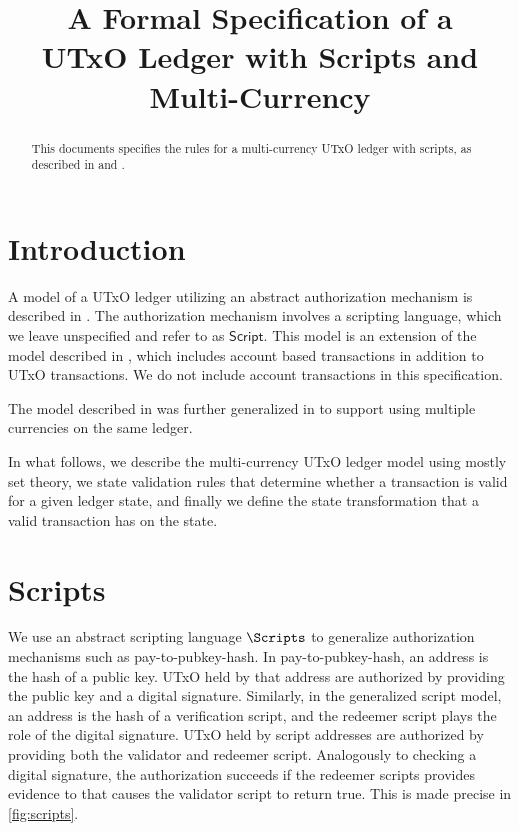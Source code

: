 \documentclass[11pt,a4paper]{article}
\newcommand{\type}[1]{\mathsf{#1}}
\newcommand{\Script}{\type{Script}}
\begin{document}
\title{A Formal Specification of a \\
       UTxO Ledger with Scripts and Multi-Currency}

\author{}


\maketitle

\begin{abstract}
This documents specifies the rules for a multi-currency UTxO ledger with scripts,
as described in \cite{multi_currency} and \cite{utxo_scripts}.
\end{abstract}

\tableofcontents
\listoffigures

\section{Introduction}

A model of a UTxO ledger utilizing an abstract authorization mechanism is
described in \cite{utxo_scripts}.  The authorization mechanism involves a
scripting language, which we leave unspecified and refer to as $\Script$.
This model is an extension of the model described in \cite{chimeric},
which includes account based transactions in addition to UTxO transactions.
We do not include account transactions in this specification.

The model described in \cite{utxo_scripts} was further generalized in
\cite{multi_currency} to support using multiple currencies on the same ledger.

In what follows, we describe the multi-currency UTxO ledger model using
mostly set theory, we state validation rules that determine whether a transaction 
is valid for a given ledger state, and finally we define the state transformation
that a valid transaction has on the state.

\section{Scripts}

We use an abstract scripting language $\Scripts$ to generalize authorization
mechanisms such as pay-to-pubkey-hash.
In pay-to-pubkey-hash, an address is the hash of a public key.
UTxO held by that address are authorized by providing the public key
and a digital signature.
Similarly, in the generalized script model, an address
is the hash of a verification script, and the redeemer script
plays the role of the digital signature.
UTxO held by script addresses are authorized by providing both the validator
and redeemer script.  Analogously to checking a digital signature,
the authorization succeeds if the redeemer scripts provides evidence to
that causes the validator script to return true.
This is made precise in \cref{fig:scripts}.
\end{document}
